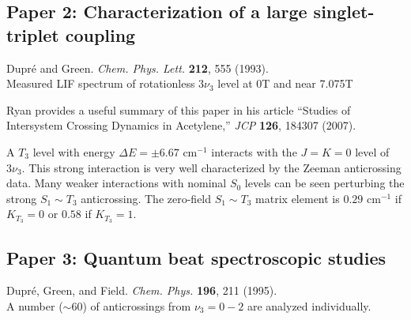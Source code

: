 \documentclass[12pt]{mitthesis}
\begin{document}
\subsection{Paper 2: Characterization of a large singlet-triplet
  coupling}

Dupr\'{e} and Green. \emph{Chem. Phys. Lett.} \textbf{212}, 555
(1993).\\
Measured LIF spectrum of rotationless $3\nu_3$ level at 0T and near 7.075T

Ryan provides a useful summary of this paper in his article ``Studies
of Intersystem Crossing Dynamics in Acetylene,'' \emph{JCP}
\textbf{126}, 184307 (2007).  

A $T_3$ level with energy $\Delta E = \pm 6.67$ cm$^{-1}$ interacts
with the $J=K=0$ level of $3\nu_3$.  This strong interaction is very
well characterized by the Zeeman anticrossing data.  Many weaker
interactions with nominal $S_0$ levels can be seen perturbing the
strong $S_1 \sim T_3$ anticrossing.  The zero-field $S_1 \sim T_3$
matrix element is $0.29$ cm$^{-1}$ if $K_{T_3}=0$ or $0.58$ if
$K_{T_3}=1$.

\subsection{Paper 3: Quantum beat spectroscopic studies}

Dupr\'{e}, Green, and Field.  \emph{Chem. Phys.} \textbf{196}, 211
(1995).\\
A number ($\sim 60$) of anticrossings from $\nu_3=0-2$ are analyzed
individually.
\end{document}
